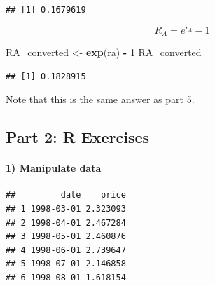 \documentclass[]{article}
\newenvironment{Shaded}{\begin{snugshade}}{\end{snugshade}}
\newcommand{\KeywordTok}[1]{\textcolor[rgb]{0.13,0.29,0.53}{\textbf{#1}}}
\newcommand{\DataTypeTok}[1]{\textcolor[rgb]{0.13,0.29,0.53}{#1}}
\newcommand{\DecValTok}[1]{\textcolor[rgb]{0.00,0.00,0.81}{#1}}
\newcommand{\StringTok}[1]{\textcolor[rgb]{0.31,0.60,0.02}{#1}}
\newcommand{\CommentTok}[1]{\textcolor[rgb]{0.56,0.35,0.01}{\textit{#1}}}
\newcommand{\OperatorTok}[1]{\textcolor[rgb]{0.81,0.36,0.00}{\textbf{#1}}}
\newcommand{\NormalTok}[1]{#1}
\let\oldparagraph\paragraph
\renewcommand{\paragraph}[1]{\oldparagraph{#1}\mbox{}}
\begin{document}
\begin{verbatim}
## [1] 0.1679619
\end{verbatim}

\[R_A = e^{r_A} - 1\]

\begin{Shaded}
\begin{Highlighting}[]
\NormalTok{RA_converted <-}\StringTok{ }\KeywordTok{exp}\NormalTok{(ra) }\OperatorTok{-}\StringTok{ }\DecValTok{1}
\NormalTok{RA_converted}
\end{Highlighting}
\end{Shaded}

\begin{verbatim}
## [1] 0.1828915
\end{verbatim}

Note that this is the same answer as part 5.

\subsection{Part 2: R Exercises}\label{part-2-r-exercises}

\paragraph{1) Manipulate data}\label{manipulate-data}

\begin{Shaded}
\end{Shaded}

\begin{verbatim}
##         date    price
## 1 1998-03-01 2.323093
## 2 1998-04-01 2.467284
## 3 1998-05-01 2.460876
## 4 1998-06-01 2.739647
## 5 1998-07-01 2.146858
## 6 1998-08-01 1.618154
\end{verbatim}
\end{document}
